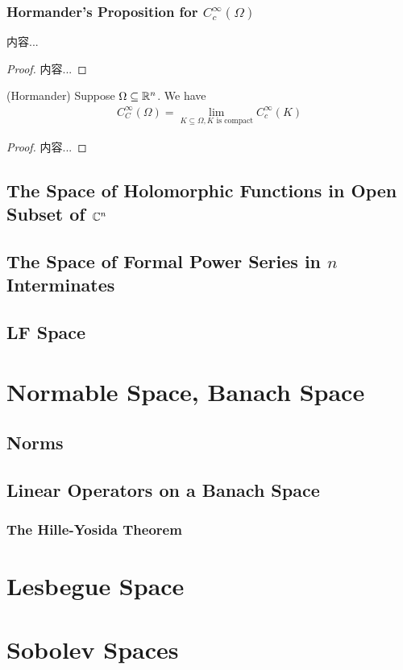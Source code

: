 \documentclass[Total.tex]{subfiles}
\begin{document}
	\subsection{Hormander's Proposition for $C^\infty_c(\Omega)$}
		\begin{lemma}
			内容...
		\end{lemma}
		\begin{proof}
			内容...
		\end{proof}
		\begin{theorem}
			(Hormander) Suppose $\Omega\subseteq \mathbb{R}^n$. We have
			\begin{gather*}
				C^\infty_C(\Omega)=\lim_{K\subseteq \Omega,K\mbox{ is compact}} C_c^\infty(K)
			\end{gather*}
		\end{theorem}
		\begin{proof}
			内容...
		\end{proof}
	\section{The Space of Holomorphic Functions in Open Subset of $\mathbb{C}^n$}
	\section{The Space of Formal Power Series in $n$ Interminates}
	\section{LF Space}
	\chapter{Normable Space, Banach Space}
		\section{Norms}
		\section{Linear Operators on a Banach Space}
			\subsection{The Hille-Yosida Theorem}
	\chapter{Lesbegue Space}
	\chapter{Sobolev Spaces}
\end{document}
